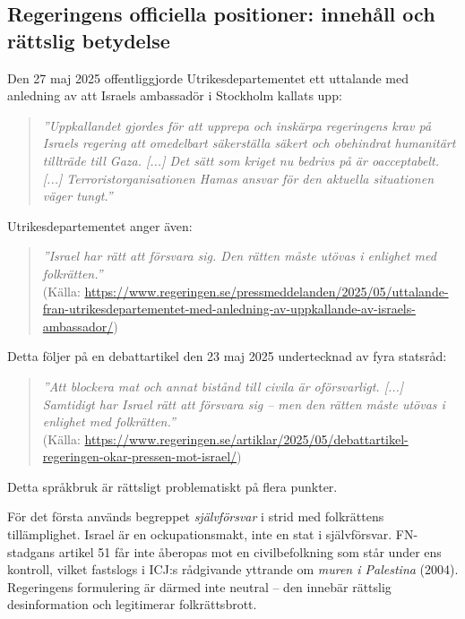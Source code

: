 


\subsection{Regeringens officiella positioner: innehåll och rättslig betydelse}

Den 27 maj 2025 offentliggjorde Utrikesdepartementet ett uttalande med anledning av att Israels ambassadör i Stockholm kallats upp:

\begin{quote}
\textit{”Uppkallandet gjordes för att upprepa och inskärpa regeringens krav på Israels regering att omedelbart säkerställa säkert och obehindrat humanitärt tillträde till Gaza. [...] Det sätt som kriget nu bedrivs på är oacceptabelt. [...] Terroristorganisationen Hamas ansvar för den aktuella situationen väger tungt.”}
\end{quote}

Utrikesdepartementet anger även:
\begin{quote}
\textit{”Israel har rätt att försvara sig. Den rätten måste utövas i enlighet med folkrätten.”}\\
(Källa: \url{https://www.regeringen.se/pressmeddelanden/2025/05/uttalande-fran-utrikesdepartementet-med-anledning-av-uppkallande-av-israels-ambassador/})
\end{quote}

Detta följer på en debattartikel den 23 maj 2025 undertecknad av fyra statsråd:

\begin{quote}
\textit{”Att blockera mat och annat bistånd till civila är oförsvarligt. [...] Samtidigt har Israel rätt att försvara sig – men den rätten måste utövas i enlighet med folkrätten.”}\\
(Källa: \url{https://www.regeringen.se/artiklar/2025/05/debattartikel-regeringen-okar-pressen-mot-israel/})
\end{quote}

\medskip

Detta språkbruk är rättsligt problematiskt på flera punkter.

För det första används begreppet \textit{självförsvar} i strid med folkrättens tillämplighet. Israel är en ockupationsmakt, inte en stat i självförsvar. FN-stadgans artikel 51 får inte åberopas mot en civilbefolkning som står under ens kontroll, vilket fastslogs i ICJ:s rådgivande yttrande om \textit{muren i Palestina} (2004). Regeringens formulering är därmed inte neutral – den innebär rättslig desinformation och legitimerar folkrättsbrott.

